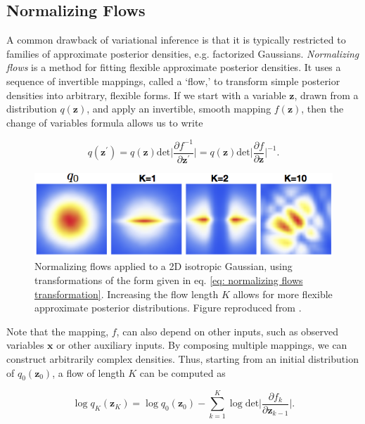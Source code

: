 \subsection{Normalizing Flows} 

A common drawback of variational inference is that it is typically restricted to families of approximate posterior densities, e.g. factorized Gaussians. \textit{Normalizing flows} \cite{rezende2015variational} is a method for fitting flexible approximate posterior densities. It uses a sequence of invertible mappings, called a `flow,' to transform simple posterior densities into arbitrary, flexible forms. If we start with a variable $\mathbf{z}$, drawn from a distribution $q(\mathbf{z})$, and apply an invertible, smooth mapping $f(\mathbf{z})$, then the change of variables formula allows us to write

\begin{equation}
q(\mathbf{z}^\prime) = q(\mathbf{z}) \text{det} \bigg\vert \frac{\partial f^{-1}}{\partial \mathbf{z}^\prime} \bigg\vert = q(\mathbf{z}) \text{det} \bigg\vert \frac{\partial f}{\partial \mathbf{z}} \bigg\vert^{-1}.
\end{equation}
\newline

\begin{figure}[h]
    \centering
    \includegraphics[width=.6\textwidth]{images/graphical_models/normalizing_flows.png}
    \caption{Normalizing flows applied to a 2D isotropic Gaussian, using transformations of the form given in eq. \ref{eq: normalizing flows transformation}. Increasing the flow length $K$ allows for more flexible approximate posterior distributions. Figure reproduced from \cite{rezende2015variational}.}
    \label{fig: full_temporal_model}
\end{figure}

\noindent Note that the mapping, $f$, can also depend on other inputs, such as observed variables $\mathbf{x}$ or other auxiliary inputs. By composing multiple mappings, we can construct arbitrarily complex densities. Thus, starting from an initial distribution of $q_0 (\mathbf{z}_0)$, a flow of length $K$ can be computed as

\begin{equation}
	\log q_K (\mathbf{z}_K) = \log q_0 (\mathbf{z}_0) - \sum_{k=1}^K \log \text{det}  \bigg\vert \frac{\partial f_k}{\partial \mathbf{z}_{k-1}} \bigg\vert.
\end{equation}


